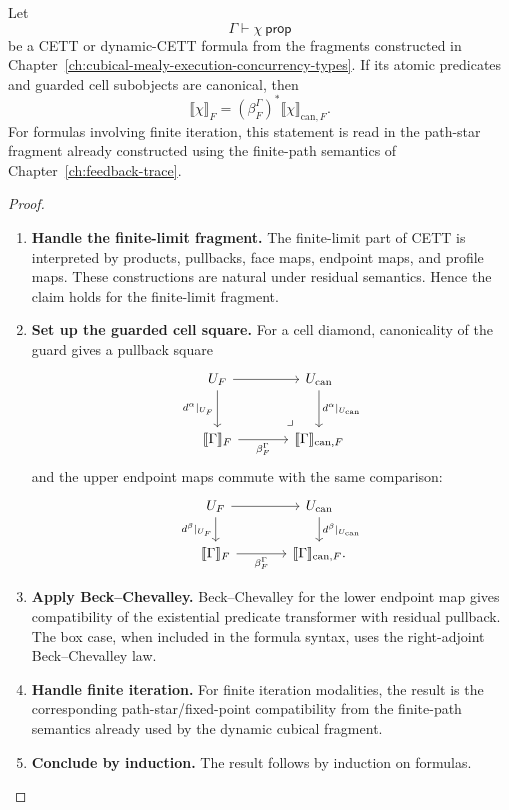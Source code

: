 \begin{theorem}
\label{thm:cubical-truth-pullback}
Let
\[
  \Gamma\vdash\chi\ \mathsf{prop}
\]
be a CETT or dynamic-CETT formula from the fragments constructed in
Chapter~\ref{ch:cubical-mealy-execution-concurrency-types}.  If its atomic
predicates and guarded cell subobjects are canonical, then
\[
  \llbracket\chi\rrbracket_F
  =
  (\beta^\Gamma_F)^*
  \llbracket\chi\rrbracket_{\mathrm{can},F}.
\]
For formulas involving finite iteration, this statement is read in the
path-star fragment already constructed using the finite-path semantics of
Chapter~\ref{ch:feedback-trace}.
\end{theorem}

\begin{proof}
\leavevmode
\begin{enumerate}
  \item \textbf{Handle the finite-limit fragment.}
  The finite-limit part of CETT is interpreted by products, pullbacks, face
  maps, endpoint maps, and profile maps.  These constructions are natural
  under residual semantics.  Hence the claim holds for the finite-limit
  fragment.

  \item \textbf{Set up the guarded cell square.}
  For a cell diamond, canonicality of the guard gives a pullback square
  \[
  \begin{tikzcd}[column sep=large,row sep=large]
  U_F
    \arrow[r]
    \arrow[d, "d^\alpha|_{U_F}"']
  &
  U_{\mathrm{can}}
    \arrow[d, "d^\alpha|_{U_{\mathrm{can}}}"]
  \\
  \llbracket\Gamma\rrbracket_F
    \arrow[r, "\beta^\Gamma_F"']
  &
  \llbracket\Gamma\rrbracket_{\mathrm{can},F}
    \arrow[ul, phantom, very near start, "\lrcorner"]
  \end{tikzcd}
  \]
  and the upper endpoint maps commute with the same comparison:
  \[
  \begin{tikzcd}[column sep=large]
  U_F
    \arrow[r]
    \arrow[d, "d^\beta|_{U_F}"']
  &
  U_{\mathrm{can}}
    \arrow[d, "d^\beta|_{U_{\mathrm{can}}}"]
  \\
  \llbracket\Gamma\rrbracket_F
    \arrow[r, "\beta^\Gamma_F"']
  &
  \llbracket\Gamma\rrbracket_{\mathrm{can},F}.
  \end{tikzcd}
  \]

  \item \textbf{Apply Beck--Chevalley.}
  Beck--Chevalley for the lower endpoint map gives compatibility of the
  existential predicate transformer with residual pullback.  The box case,
  when included in the formula syntax, uses the right-adjoint
  Beck--Chevalley law.

  \item \textbf{Handle finite iteration.}
  For finite iteration modalities, the result is the corresponding
  path-star/fixed-point compatibility from the finite-path semantics already
  used by the dynamic cubical fragment.

  \item \textbf{Conclude by induction.}
  The result follows by induction on formulas.
\end{enumerate}
\end{proof}

